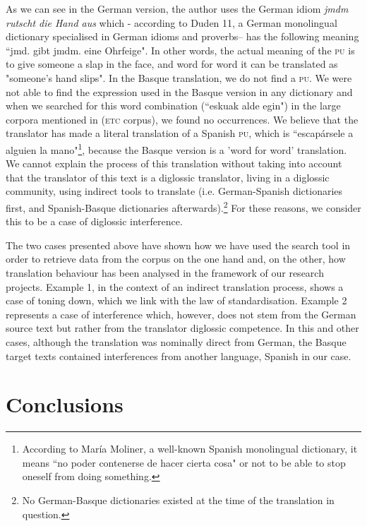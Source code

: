 \documentclass[output=paper]{LSP/langsci}
\begin{document}
As we can see in the German version, the author uses the German idiom \textit{jmdm rutscht die Hand aus} which - according to Duden 11, a German monolingual dictionary specialised in German idioms and proverbs– has the following meaning “jmd. gibt jmdm. eine Ohrfeige". In other words, the actual meaning of the \textsc{pu} is to give someone a slap in the face, and word for word it can be translated as "someone's hand slips". In the Basque translation, we do not find a \textsc{pu}. We were not able to find the expression used in the Basque version in any dictionary and when we searched for this word combination (“eskuak alde egin") in the large corpora mentioned in  (\textsc{etc} corpus), we found no occurrences. We believe that the translator has made a literal translation of a Spanish \textsc{pu}, which is “escapársele a alguien la mano"\footnote{According to María Moliner, a well-known Spanish monolingual dictionary, it means “no poder contenerse de hacer cierta cosa" or not to be able to stop oneself from doing something.}, because the Basque version is a 'word for word' translation. We cannot explain the process of this translation without taking into account that the translator of this text is a diglossic translator, living in a diglossic community, using indirect tools to translate (i.e. German-Spanish dictionaries first, and Spanish-Basque dictionaries afterwards).\footnote{No German-Basque dictionaries existed at the time of the translation in question.} For these reasons, we consider this to be a case of diglossic interference.

The two cases presented above have shown how we have used the search tool in order to retrieve data from the corpus on the one hand and, on the other, how translation behaviour has been analysed in the framework of our research projects. Example 1, in the context of an indirect translation process, shows a case of toning down, which we link with the law of standardisation. Example 2 represents a case of interference which, however, does not stem from the German source text but rather from the translator diglossic competence. In this and other cases, although the translation was nominally direct from German, the Basque target texts contained interferences from another language, Spanish in our case.

\section{Conclusions}
\end{document}
